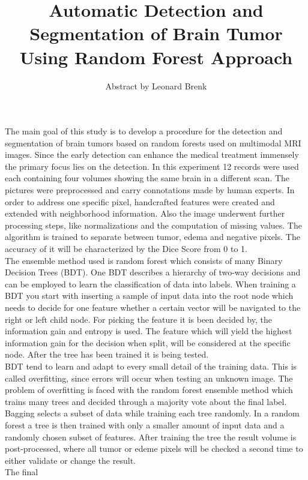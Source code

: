 \documentclass{article}
\title{Automatic Detection and Segmentation of Brain Tumor Using Random Forest Approach}
\author{Abstract by Leonard Brenk}
\begin{document}
 \maketitle
 \newpage

The main goal of this study is to develop a procedure for the detection and segmentation of brain tumors based on random forests used on multimodal MRI images. Since the early detection can enhance the medical treatment immensely the primary focus lies on the detection. In this experiment 12 records were used each containing four volumes showing the same brain in a different scan. The pictures were preprocessed and carry connotations made by human experts. In order to address one specific pixel, handcrafted features were created and extended with neighborhood information. Also the image underwent further processing steps, like normalizations and the computation of missing values. The algorithm is trained to separate between tumor, edema and negative pixels. The accuracy of it will be characterized by the Dice Score from 0 to 1. \\

The ensemble method used is random forest which consists of many Binary Decision Trees (BDT). One BDT describes a hierarchy of two-way decisions and can be employed to learn the classification of data into labels. When training a BDT you start with inserting a sample of input data into the root node which needs to decide for one feature whether a certain vector will be navigated to the right or left child node. For picking the feature it is been decided by, the information gain and entropy is used. The feature which will yield the highest information gain for the decision when split, will be considered at the specific node. After the tree has been trained it is being tested. \\

BDT tend to learn and adapt to every small detail of the training data. This is called overfitting, since errors will occur when testing an unknown image. The problem of overfitting is faced with the random forest ensemble method which trains many trees and decided through a majority vote about the final label. Bagging selects a subset of data while training each tree randomly. In a random forest a tree is then trained with only a smaller amount of input data and a randomly chosen subset of features. After training the tree the result volume is post-processed, where all tumor or edeme pixels will be checked a second time to either validate or change the result. \\

The final 
\end{document}
